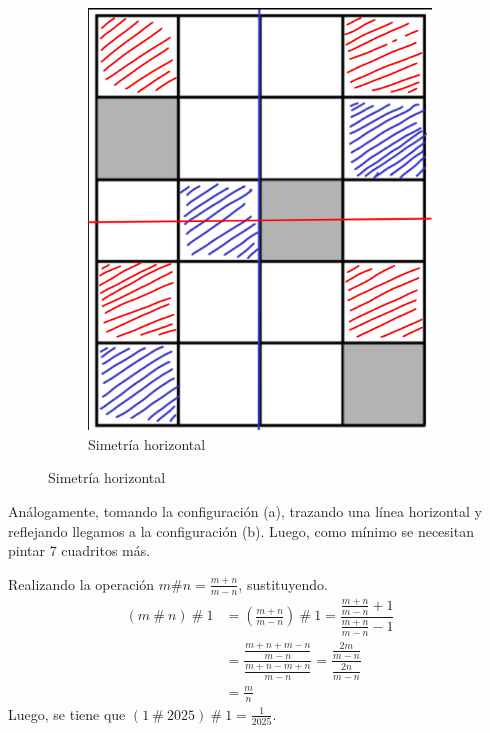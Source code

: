 \begin{solution}[(Problema 1)]
\begin{figure}[H]
\begin{subfigure}{0.27\textwidth}
            \includegraphics[width=\textwidth]{content/figure5}
            \caption{Simetría horizontal}
        \end{subfigure}
    \end{figure}
    Análogamente, tomando la configuración (a), trazando una línea horizontal y reflejando llegamos a la configuración (b).
    Luego, como mínimo se necesitan pintar 7 cuadritos más.
\end{solution}

\begin{solution}[(Problema 2)]
    Realizando la operación $m \# n = \frac{m + n}{m - n}$, sustituyendo.
    \begin{align*}
        (m\ \#\ n)\ \#\ 1 &= \left(\frac{m + n}{m - n}\right)\ \# \ 1
        = \dfrac{\frac{m + n}{m - n} + 1}{\frac{m + n}{m - n} - 1}\\
        &= \dfrac{\frac{m + n + m - n}{m - n}}{\frac{m + n- m + n}{m - n}}
        = \dfrac{\frac{2m}{m - n}}{\frac{2n}{m - n}}\\
        &= \frac{m}{n}
    \end{align*}
    Luego, se tiene que $(1\ \#\ 2025)\ \#\ 1 = \frac{1}{2025}$.
\end{solution}

